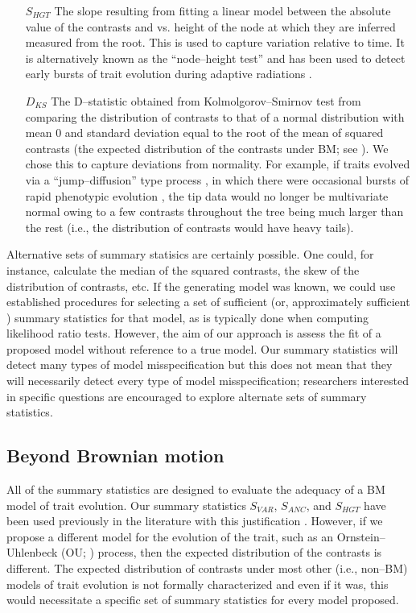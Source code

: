 \documentclass[a4paper,12pt]{article}
\begin{document}
\begin{enumerate}
\item[$S_{HGT}$] The slope resulting from fitting a linear model between the absolute value of the contrasts and vs. height of the node at which they are inferred measured from the root. This is used to capture variation relative to time. It is alternatively known as the ``node--height test'' and has been used to detect early bursts of trait evolution during adaptive radiations \citep{FreckletonHarvey2006, SlaterPennell}. 

\item[$D_{KS}$] The D--statistic obtained from Kolmolgorov--Smirnov test from comparing the distribution of contrasts to that of a normal distribution with mean $0$ and standard deviation equal to the root of the mean of squared contrasts (the expected distribution of the contrasts under BM; see \citep{Felsenstein1985, Rohlf2001}). We chose this to capture deviations from normality. For example, if traits evolved via a ``jump--diffusion'' type process \citep{Landis2012}, in which there were occasional bursts of rapid phenotypic evolution \citep{PennellPE}, the tip data would no longer be multivariate normal owing to a few contrasts throughout the tree being much larger than the rest (i.e., the distribution of contrasts would have heavy tails). 

\end{enumerate}

Alternative sets of summary statisics are certainly possible. One could, for instance, calculate the median of the squared contrasts, the skew of the distribution of contrasts, etc. If the generating model was known, we could use established procedures for selecting a set of sufficient (or, approximately sufficient \citep{MajoramJoyce}) summary statistics for that model, as is typically done when computing likelihood ratio tests. However, the aim of our approach is assess the fit of a proposed model without reference to a true model. Our summary statistics will detect many types of model misspecification but this does not mean that they will necessarily detect every type of model misspecification; researchers interested in specific questions are encouraged to explore alternate sets of summary statistics. 

\subsection*{Beyond Brownian motion}

All of the summary statistics are designed to evaluate the adequacy of a BM model of trait evolution. Our summary statistics $S_{VAR}$, $S_{ANC}$, and $S_{HGT}$ have been used previously in the literature with this justification \citep{Garland1992, Garland1993,  Diaz1996}. However, if we propose a different model for the evolution of the trait, such as an Ornstein--Uhlenbeck (OU; \citep{Hansen1997}) process, then the expected distribution of the contrasts is different. The expected distribution of contrasts under most other (i.e., non--BM) models of trait evolution is not formally characterized and even if it was, this would necessitate a specific set of summary statistics for every model proposed.
\end{document}
